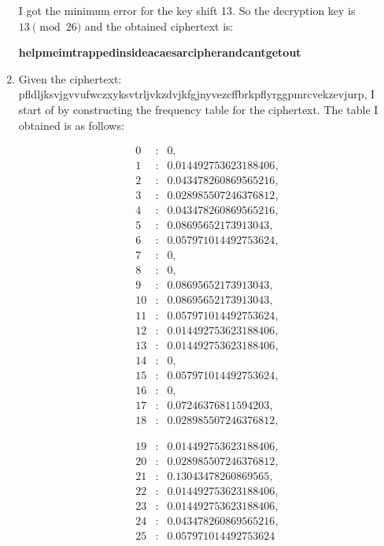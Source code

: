 \documentclass{ashoka-crypto}
\begin{document}
\begin{enumerate}[label=(\alph*)]
I got the minimum error for the key shift 13. So the decryption key is $13 \pmod {26}$ and the obtained ciphertext is:

\textbf{helpmeimtrappedinsideacaesarcipherandcantgetout}

\item Given the ciphertext: pfldljksvjgvvufwczxyksvtrljvkzdvjkfgjnyvezcffbrkpflyrggpmrcvekzevjurp, I start of by constructing the frequency table for the ciphertext. The table I obtained is as follows:

\[
\begin{array}{rcl}
0 & : & 0, \\
1 & : & 0.014492753623188406, \\
2 & : & 0.043478260869565216, \\
3 & : & 0.028985507246376812, \\
4 & : & 0.043478260869565216, \\
5 & : & 0.08695652173913043, \\
6 & : & 0.057971014492753624, \\
7 & : & 0, \\
8 & : & 0, \\
9 & : & 0.08695652173913043, \\
10 & : & 0.08695652173913043, \\
11 & : & 0.057971014492753624, \\
12 & : & 0.014492753623188406, \\
13 & : & 0.014492753623188406, \\
14 & : & 0,\\
15 & : & 0.057971014492753624, \\
16 & : & 0, \\
17 & : & 0.07246376811594203, \\
18 & : & 0.028985507246376812, 
\end{array}
\]

\[
\begin{array}{rcl}
19 & : & 0.014492753623188406, \\
20 & : & 0.028985507246376812, \\
21 & : & 0.13043478260869565, \\
22 & : & 0.014492753623188406, \\
23 & : & 0.014492753623188406, \\
24 & : & 0.043478260869565216, \\
25 & : & 0.057971014492753624
\end{array}
\]



\end{enumerate}
\end{document}

